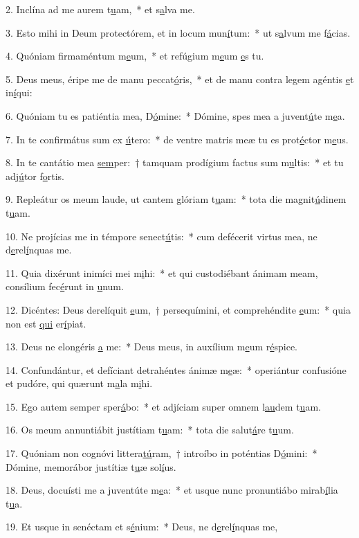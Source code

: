 2. Inclína ad me aurem t\uline{u}am,~* et s\uline{a}lva me.\par 
3. Esto mihi in Deum protectórem, et in locum mun\uline{í}tum:~* ut s\uline{a}lvum me f\uline{á}cias.\par 
4. Quóniam firmaméntum m\uline{e}um,~* et refúgium m\uline{e}um \uline{e}s tu.\par 
5. Deus meus, éripe me de manu peccat\uline{ó}ris,~* et de manu contra legem agéntis \uline{e}t in\uline{í}qui:\par 
6. Quóniam tu es patiéntia mea, D\uline{ó}mine:~* Dómine, spes mea a juvent\uline{ú}te m\uline{e}a.\par 
7. In te confirmátus sum ex \uline{ú}tero:~* de ventre matris meæ tu es prot\uline{é}ctor m\uline{e}us.\par 
8. In te cantátio mea \uline{sem}per:~† tamquam prodígium factus sum m\uline{u}ltis:~* et tu adj\uline{ú}tor f\uline{o}rtis.\par 
9. Repleátur os meum laude, ut cantem glóriam t\uline{u}am:~* tota die magnit\uline{ú}dinem t\uline{u}am.\par 
10. Ne projícias me in témpore senect\uline{ú}tis:~* cum defécerit virtus mea, ne d\uline{e}rel\uline{í}nquas me.\par 
11. Quia dixérunt inimíci mei m\uline{i}hi:~* et qui custodiébant ánimam meam, consílium fec\uline{é}runt in \uline{u}num.\par 
12. Dicéntes: Deus derelíquit \uline{e}um,~† persequímini, et comprehéndite \uline{e}um:~* quia non est \uline{qui} er\uline{í}piat.\par 
13. Deus ne elongéris \uline{a} me:~* Deus meus, in auxílium m\uline{e}um r\uline{é}spice.\par 
14. Confundántur, et defíciant detrahéntes ánimæ m\uline{e}æ:~* operiántur confusióne et pudóre, qui quærunt m\uline{a}la m\uline{i}hi.\par 
15. Ego autem semper sper\uline{á}bo:~* et adjíciam super omnem l\uline{au}dem t\uline{u}am.\par 
16. Os meum annuntiábit justítiam t\uline{u}am:~* tota die salut\uline{á}re t\uline{u}um.\par 
17. Quóniam non cognóvi littera\uline{tú}ram,~† introíbo in poténtias D\uline{ó}mini:~* Dómine, memorábor justítiæ t\uline{u}æ sol\uline{í}us.\par 
18. Deus, docuísti me a juventúte m\uline{e}a:~* et usque nunc pronuntiábo mirab\uline{í}lia t\uline{u}a.\par 
19. Et usque in senéctam et s\uline{é}nium:~* Deus, ne d\uline{e}rel\uline{í}nquas me,\par 
